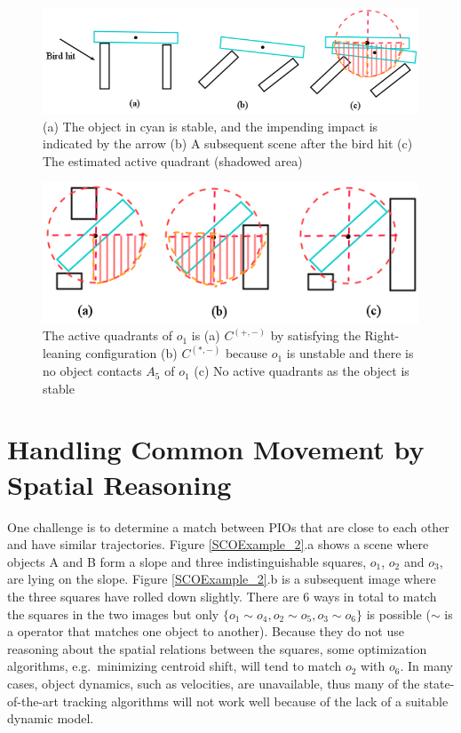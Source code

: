 \documentclass[letterpaper]{article}
\begin{document}
\begin{figure}[t!]
\centering\includegraphics[scale=0.28]{BirdImpact.png}\caption{(a) The object in cyan is stable, and the impending impact is indicated by the arrow (b) A subsequent scene after the bird hit (c) The estimated active quadrant (shadowed area)}
\label{BirdImpact}
\end{figure}

\begin{figure}[t!]
\centering\includegraphics[scale=0.35]{ScenarioByRules.png}\caption{ The active quadrants of $o_1$ is (a)  $C^{(+,-)}$ by satisfying the Right-leaning configuration (b) $C^{(*,-)}$ because $o_1$ is unstable and there is no object contacts $A_5$ of $o_1$ (c) No active quadrants as the object is stable}
\label{ScenarioByRules}
\vspace{-5mm}
\end{figure}

\section{Handling Common Movement by Spatial Reasoning}
\label{CM}

One challenge is to determine a match between PIOs that are close to each other and have similar trajectories. Figure \ref{SCOExample_2}.a  shows a scene where objects A and B form a slope and three indistinguishable squares, $o_1$, $o_2$ and $o_3$, are lying on the slope. Figure \ref{SCOExample_2}.b is a subsequent image where the three squares have rolled down slightly. There are 6 ways in total to match the squares in the two images but only $\{o_1 \sim o_4, o_2 \sim o_5, o_3 \sim o_6\}$ is possible ($\sim$ is a operator that matches one object to another). Because they do not use reasoning about the spatial relations between the squares, some optimization algorithms, e.g.\ minimizing centroid shift, will tend to match $o_2$ with $o_6$. In many cases, object dynamics, such as velocities, are unavailable, thus many of the state-of-the-art tracking algorithms will not work well because of the lack of a suitable dynamic model. 
\end{document}

